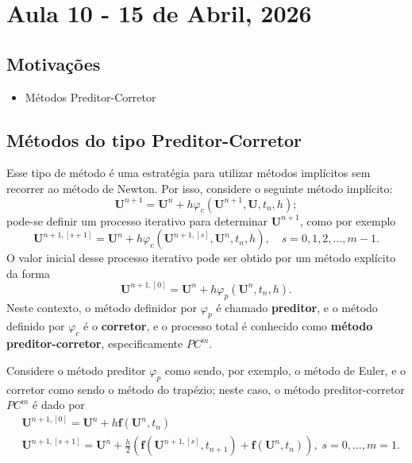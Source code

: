 \documentclass[../differential_methods.tex]{subfiles}
\begin{document}
\section{Aula 10 - 15 de Abril, 2026}
\subsection{Motivações}
\begin{itemize}
	\item Métodos Preditor-Corretor
\end{itemize}
\subsection{Métodos do tipo Preditor-Corretor}
Esse tipo de método é uma estratégia para utilizar métodos implícitos sem recorrer ao método de Newton. Por isso, considere o seguinte método implícito:
\[
	\mathbf{U}^{n+1} = \mathbf{U}^{n} + h \varphi_{c}(\mathbf{U}^{n+1}, \mathbf{U}, t_{n}, h);
\]
pode-se definir um processo iterativo para determinar \(\mathbf{U}^{n+1}\), como por exemplo
\[
	\mathbf{U}^{n+1, [s+1]} = \mathbf{U}^{n} + h \varphi_{c}(\mathbf{U}^{n+1, [s]}, \mathbf{U}^{n}, t_{n}, h), \quad s=0, 1, 2, \dotsc , m-1.
\]
O valor inicial desse processo iterativo pode ser obtido por um método explícito da forma
\[
	\mathbf{U}^{n+1, [0]} = \mathbf{U}^{n} + h \varphi_{p}(\mathbf{U}^{n}, t_{n}, h).
\]
Neste contexto, o método definidor por \(\varphi_{p}\) é chamado \textbf{preditor}, e o método definido por \(\varphi_{c}\) é o \textbf{corretor}, e o processo total é conhecido como \textbf{método preditor-corretor}, especificamente \(PC^{m}\).

\begin{example}

	Considere o método preditor \(\varphi_{p}\) como sendo, por exemplo, o método de Euler, e o corretor como sendo o método do trapézio; neste caso, o método preditor-corretor \(PC^{m}\) é dado por
	\begin{align*}
		 & \mathbf{U}^{n+1, [0]} = \mathbf{U}^{n} + h \mathbf{f}(\mathbf{U}^{n}, t_{n})                                                                                   \\
		 & \mathbf{U}^{n+1, [s+1]} = \mathbf{U}^{n}+ \frac{h}{2}(\mathbf{f}(\mathbf{U}^{n+1, [s]}, t_{n+1}) + \mathbf{f}(\mathbf{U}^{n}, t_{n})), \; s = 0, \dotsc , m=1.
	\end{align*}
\end{example}
\end{document}
